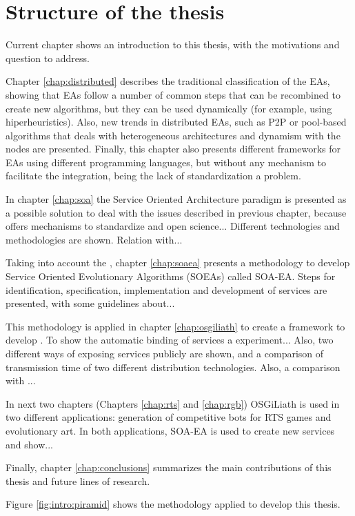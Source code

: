 \section{Structure of the thesis}
\label{sec:intro:structure}

Current chapter shows an introduction to this thesis, with the motivations and question to address. 

Chapter \ref{chap:distributed} describes the traditional classification of the EAs, showing that EAs follow a number of common steps that can be recombined to create new algorithms, but they can be used dynamically (for example, using hiperheuristics). Also, new trends in distributed EAs, such as P2P or pool-based algorithms that deals with heterogeneous architectures and dynamism with the nodes are presented. Finally, this chapter also presents different frameworks for EAs using different programming languages, but without any mechanism to facilitate the integration, being the lack of standardization a problem.

In chapter \ref{chap:soa} the Service Oriented Architecture paradigm is presented as a possible solution to deal with the issues described in previous chapter, because offers mechanisms to standardize and open science... Different technologies and methodologies are shown. Relation with...

Taking into account the , chapter \ref{chap:soaea} presents a methodology to develop Service Oriented Evolutionary Algorithms (SOEAs) called SOA-EA. Steps for identification, specification, implementation and development of services are presented, with some guidelines about...

This methodology is applied in chapter \ref{chap:osgiliath} to create a framework to develop . To show the automatic binding of services a experiment... Also, two different ways of exposing services publicly are shown, and a comparison of transmission time of two different distribution technologies. Also, a comparison with ...

In next two chapters (Chapters \ref{chap:rts} and \ref{chap:rgb}) OSGiLiath is used in two different applications: generation of competitive bots for RTS games and evolutionary art. In both applications, SOA-EA is used to create new services and show...

Finally, chapter \ref{chap:conclusions} summarizes the main contributions of this thesis and future lines of research.

Figure \ref{fig:intro:piramid} shows the methodology applied to develop this thesis.

